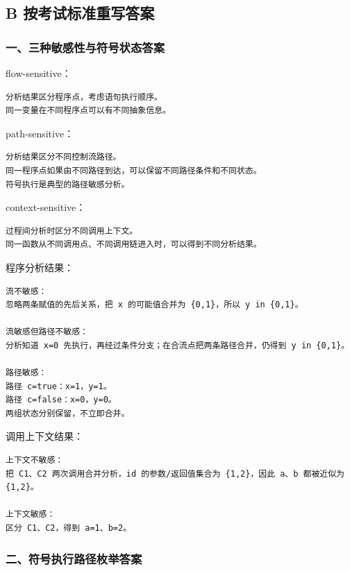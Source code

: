 \documentclass[UTF8]{ctexart}
\begin{document}
\subsection*{B 按考试标准重写答案}

\subsubsection*{一、三种敏感性与符号状态答案}

flow-sensitive：

\begin{Verbatim}[fontsize=\small,breaklines=true]
分析结果区分程序点，考虑语句执行顺序。
同一变量在不同程序点可以有不同抽象信息。
\end{Verbatim}

path-sensitive：

\begin{Verbatim}[fontsize=\small,breaklines=true]
分析结果区分不同控制流路径。
同一程序点如果由不同路径到达，可以保留不同路径条件和不同状态。
符号执行是典型的路径敏感分析。
\end{Verbatim}

context-sensitive：

\begin{Verbatim}[fontsize=\small,breaklines=true]
过程间分析时区分不同调用上下文。
同一函数从不同调用点、不同调用链进入时，可以得到不同分析结果。
\end{Verbatim}

程序分析结果：

\begin{Verbatim}[fontsize=\small,breaklines=true]
流不敏感：
忽略两条赋值的先后关系，把 x 的可能值合并为 {0,1}，所以 y in {0,1}。

流敏感但路径不敏感：
分析知道 x=0 先执行，再经过条件分支；在合流点把两条路径合并，仍得到 y in {0,1}。

路径敏感：
路径 c=true：x=1，y=1。
路径 c=false：x=0，y=0。
两组状态分别保留，不立即合并。
\end{Verbatim}

调用上下文结果：

\begin{Verbatim}[fontsize=\small,breaklines=true]
上下文不敏感：
把 C1、C2 两次调用合并分析，id 的参数/返回值集合为 {1,2}，因此 a、b 都被近似为 {1,2}。

上下文敏感：
区分 C1、C2，得到 a=1、b=2。
\end{Verbatim}

\subsubsection*{二、符号执行路径枚举答案}
\end{document}
